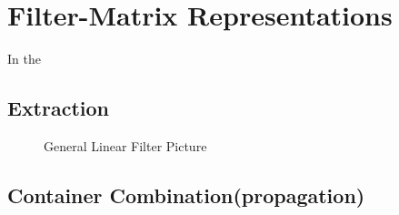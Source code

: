 \section{Filter-Matrix Representations}
In the 


\subsection{Extraction}
\begin{figure}
\center
\epsfxsize=2.5in
\caption{General Linear Filter Picture}
\label{fig:overview}
\end{figure}


\subsection{Container Combination(propagation)}

